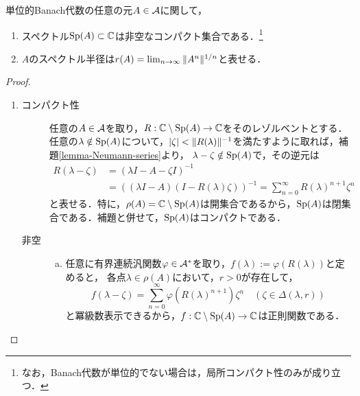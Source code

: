 \documentclass[uplatex,dvipdfmx]{jsreport}
\begin{document}
\begin{theorem}\label{thm-Spectrum-is-compact}
    単位的Banach代数の任意の元$A\in\mathcal{A}$に関して，
    \begin{enumerate}
        \item スペクトル$\mathrm{Sp}(A)\subset\mathbb{C}$は非空なコンパクト集合である．\footnote{なお，Banach代数が単位的でない場合は，局所コンパクト性のみが成り立つ．}
        \item $A$のスペクトル半径は$r(A)=\lim_{n\to\infty}\|A^n\|^{1/n}$と表せる．
    \end{enumerate}
\end{theorem}
\begin{proof}\mbox{}
    \begin{enumerate}
        \item 
        \begin{description}
            \item[コンパクト性] 任意の$A\in\mathcal{A}$を取り，$R:\mathbb{C}\setminus\mathrm{Sp}(A)\to\mathbb{C}$をそのレゾルベントとする．
            任意の$\lambda\notin\mathrm{Sp}(A)$について，$\lvert\zeta\rvert<\|R(\lambda)\|^{-1}$を満たすように取れば，補題\ref{lemma-Neumann-series}より，
            $\lambda-\zeta\notin\mathrm{Sp}(A)$で，その逆元は
            \begin{align*}
                R(\lambda-\zeta)&=(\lambda I-A-\zeta I)^{-1}\\
                &=((\lambda I-A)(I-R(\lambda)\zeta))^{-1}=\sum^\infty_{n=0}R(\lambda)^{n+1}\zeta^n
            \end{align*}
            と表せる．特に，$\rho(A)=\mathbb{C}\setminus\mathrm{Sp}(A)$は開集合であるから，$\mathrm{Sp}(A)$は閉集合である．補題と併せて，$\mathrm{Sp}(A)$はコンパクトである．
            \item[非空]
            \begin{enumerate}[(a)]
                \item 任意に有界連続汎関数$\varphi\in\mathcal{A}^*$を取り，$f(\lambda):=\varphi(R(\lambda))$と定めると，
                各点$\lambda\in\rho(A)$において，$r>0$が存在して，
                \[f(\lambda-\zeta)=\sum^\infty_{n=0}\varphi(R(\lambda)^{n+1})\zeta^n\quad(\zeta\in\Delta(\lambda,r))\]
                と冪級数表示できるから，$f:\mathbb{C}\setminus\mathrm{Sp}(A)\to\mathbb{C}$は正則関数である．


\end{enumerate}
\end{description}
\end{enumerate}
\end{proof}
\end{document}
